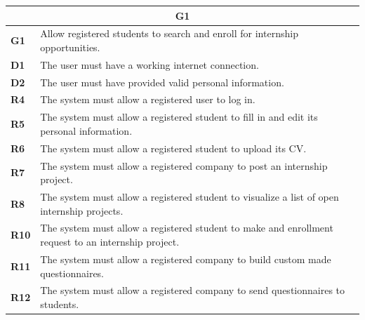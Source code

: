 \begin{table}[H]
    \centering
    \begin{tabular}{|l|m{10cm}|}
        \hline \multicolumn{2}{|c|}{\textbf{G1}} \\
        \hline \textbf{G1} & Allow registered students to search and enroll for internship opportunities. \\
        \hline \textbf{D1} & The user must have a working internet connection. \\
        \hline \textbf{D2} & The user must have provided valid personal information. \\
        \hline \textbf{R4} & The system must allow a registered user to log in. \\
        \hline \textbf{R5} & The system must allow a registered student to fill in and edit its personal information. \\
        \hline \textbf{R6} & The system must allow a registered student to upload its CV. \\
        \hline \textbf{R7} & The system must allow a registered company to post an internship project. \\
        \hline \textbf{R8} & The system must allow a registered student to visualize a list of open internship projects. \\
        \hline \textbf{R10} & The system must allow a registered student to make and enrollment request to an internship project. \\
        \hline \textbf{R11} & The system must allow a registered company to build custom made questionnaires. \\
        \hline \textbf{R12} & The system must allow a registered company to send questionnaires to students. \\

\end{tabular}
\end{table}
